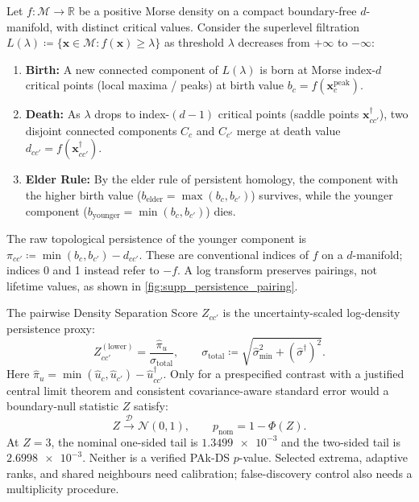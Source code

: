 \begin{theorem}
  \label{thm:persistence_elder_rule}
  Let $f:\mathcal M\to\mathbb R$ be a positive Morse density on a
  compact boundary-free $d$-manifold, with distinct critical values.
  Consider the superlevel filtration $L(\lambda) \coloneqq
  \{\mathbf{x} \in \mathcal{M} : f(\mathbf{x}) \ge \lambda\}$ as
  threshold $\lambda$ decreases from $+\infty$ to $-\infty$:
  \begin{enumerate}[noitemsep,topsep=2pt]
    \item \textbf{Birth:} A new connected component of $L(\lambda)$
      is born at Morse index-$d$ critical points (local maxima /
      peaks) at birth value $b_c = f(\mathbf{x}_c^{\mathrm{peak}})$.
    \item \textbf{Death:} As $\lambda$ drops to index-$(d-1)$ critical
      points (saddle points $\mathbf{x}_{cc'}^\dagger$), two
      disjoint connected components $C_c$ and $C_{c'}$ merge at
      death value $d_{cc'} = f(\mathbf{x}_{cc'}^\dagger)$.
    \item \textbf{Elder Rule:} By the elder rule of persistent
      homology, the component with the higher birth value
      ($b_{\mathrm{elder}} = \max(b_c, b_{c'})$) survives, while the
      younger component ($b_{\mathrm{younger}} = \min(b_c, b_{c'})$) dies.
  \end{enumerate}
  The raw topological persistence of the younger component is
  $\pi_{cc'} \coloneqq \min(b_c, b_{c'}) - d_{cc'}$.
  These are conventional indices of $f$ on a $d$-manifold; indices
  0 and 1 instead refer to $-f$. A log transform preserves pairings,
  not lifetime values, as shown in \cref{fig:supp_persistence_pairing}.
\end{theorem}

\begin{remark}
  \label{cor:calibrated_persistence}
  The pairwise \pak{} Density Separation Score $Z_{cc'}$ is the
  uncertainty-scaled log-density persistence proxy:
  \begin{equation}
    Z_{cc'}^{(\mathrm{lower})}=\frac{\hat\pi_u}{\sigma_{\mathrm{total}}},
    \qquad
    \sigma_{\mathrm{total}} \coloneqq \sqrt{\hat{\sigma}_{\min}^2 +
    (\hat{\sigma}^\dagger)^2}.
    \label{eq:calibrated_persistence}
  \end{equation}
  Here $\hat\pi_u=\min(\hat u_c,\hat u_{c'})-\hat u_{cc'}^\dagger$.
  Only for a prespecified contrast with a justified central limit
  theorem and consistent covariance-aware standard error would a
  boundary-null statistic $Z$ satisfy:
  \begin{equation}
    Z\xrightarrow{\mathcal D}\mathcal N(0,1),\qquad
    p_{\mathrm{nom}}=1-\Phi(Z).
    \label{eq:zscore_pvalue}
  \end{equation}
  At $Z=3$, the nominal one-sided tail is $\num{1.3499e-3}$ and the
  two-sided tail is $\num{2.6998e-3}$. Neither is a verified PAk-DS
  $p$-value. Selected extrema, adaptive ranks, and shared neighbours need
  calibration; false-discovery control also needs a multiplicity procedure.
\end{remark}

